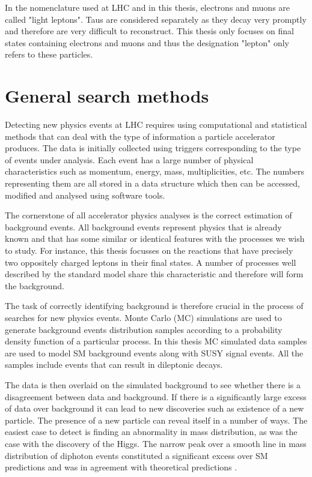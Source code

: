 In the nomenclature used at LHC and in this thesis, electrons and muons are called "light leptons". Taus are considered separately as they decay very promptly and therefore are very difficult to reconstruct. This thesis only focuses on final states containing electrons and muons and thus the designation "lepton" only refers to these particles.  

 


\section{General search methods}
Detecting new physics events at LHC requires using computational and statistical methods that can deal with the type of information a particle accelerator produces. The data is initially collected using triggers corresponding to the type of events under analysis. Each event has a large number of physical characteristics such as momentum, energy, mass, multiplicities, etc. The numbers representing them are all stored in a data structure which then can be accessed, modified and analysed using software tools. 

The cornerstone of all accelerator physics analyses is the correct estimation of background events. All background events represent physics that is already known and that has some similar or identical features with the processes we wish to study. For instance, this thesis focusses on the reactions that have precisely two oppositely charged leptons in their final states. A number of processes well described by the standard model share this characteristic and therefore will form the background. 

The task of correctly identifying background is therefore crucial in the process of searches for new physics events. Monte Carlo (MC) simulations are used to generate background events distribution samples according to a probability density function of a particular process. In this thesis MC simulated data samples are used to model SM background events along with SUSY signal events. All the samples include events that can result in dileptonic decays. 

The data is then overlaid on the simulated background to see whether there is a disagreement between data and background. If there is a significantly large excess of data over background it can lead to new discoveries such as existence of a new particle.  The presence of a new particle can reveal itself in a number of ways. The easiest case to detect is finding an abnormality in mass distribution, as was the case with the discovery of the Higgs. The narrow peak over a smooth line in mass distribution of diphoton events constituted a significant excess over SM predictions and was in agreement with theoretical predictions \citep{Aad:2012tfa}. 

